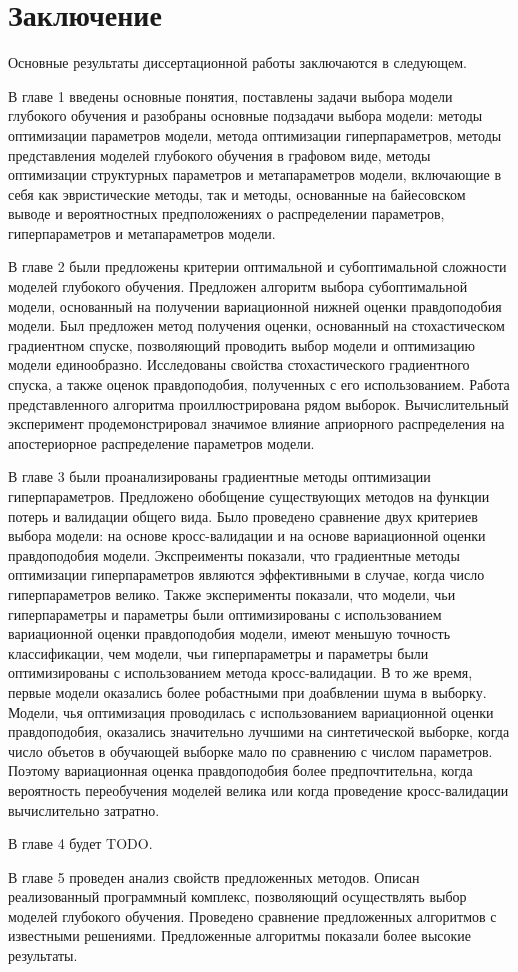 
\chapter*{Заключение}
Основные результаты диссертационной работы заключаются в следующем.

В главе 1 введены основные понятия, поставлены задачи выбора модели глубокого обучения и разобраны основные подзадачи выбора модели: 
методы оптимизации параметров модели, метода оптимизации гиперпараметров, методы представления моделей глубокого обучения в графовом виде, методы оптимизации структурных параметров и метапараметров модели, включающие в себя как эвристические методы, так и методы, основанные на байесовском выводе и вероятностных предположениях о распределении параметров, гиперпараметров и метапараметров модели.

В главе 2 были предложены критерии оптимальной и субоптимальной сложности моделей глубокого обучения. Предложен алгоритм выбора субоптимальной модели, основанный на получении вариационной нижней оценки  правдоподобия модели. Был предложен метод получения оценки, основанный на стохастическом градиентном спуске, позволяющий проводить выбор модели и оптимизацию модели единообразно. Исследованы свойства стохастического градиентного спуска, а также оценок правдоподобия, полученных с его использованием. 
Работа представленного алгоритма проиллюстрирована рядом выборок. 
Вычислительный эксперимент продемонстрировал значимое влияние априорного распределения на апостериорное распределение параметров модели. 

В главе 3 были проанализированы градиентные методы оптимизации гиперпараметров. Предложено обобщение существующих методов на функции потерь и валидации общего вида.
Было проведено сравнение двух критериев выбора модели: на основе кросс-валидации и на основе вариационной оценки правдоподобия модели.
Экспреименты показали, что градиентные методы оптимизации гиперпараметров являются эффективными в случае, когда число гиперпараметров велико. Также эксперименты показали, что модели, чьи гиперпараметры и параметры были оптимизированы с использованием вариационной оценки правдоподобия модели, имеют меньшую точность классификации, чем модели, чьи гиперпараметры и параметры были оптимизированы с использованием метода кросс-валидации. В то же время, первые модели оказались более робастными при доабвлении шума в выборку. Модели, чья оптимизация проводилась с использованием вариационной оценки правдоподобия, оказались значительно лучшими на синтетической выборке, когда число объетов в обучающей выборке мало по сравнению с числом параметров. Поэтому вариационная оценка правдоподобия более предпочтительна, когда вероятность переобучения моделей велика или когда проведение кросс-валидации вычислительно затратно.

В главе 4 будет TODO.

В главе 5 проведен анализ свойств предложенных методов. Описан реализованный программный комплекс, позволяющий осуществлять выбор моделей глубокого обучения. Проведено сравнение предложенных алгоритмов с известными решениями. Предложенные алгоритмы показали более высокие результаты. 

